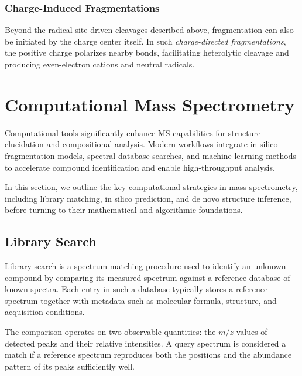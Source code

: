\subsubsection{Charge-Induced Fragmentations}

Beyond the radical-site-driven cleavages described above, fragmentation can also be initiated by the charge center itself.
In such \emph{charge-directed fragmentations}, the positive charge polarizes nearby bonds, facilitating heterolytic cleavage and producing even-electron cations and neutral radicals.
\cite[pp.~281]{Hoffmann2011}


\section{Computational Mass Spectrometry}

Computational tools significantly enhance MS capabilities for structure elucidation and compositional analysis. \cite[pp.~1--2]{Scheubert2013}
Modern workflows integrate in silico fragmentation models, spectral database searches, and machine-learning methods to accelerate compound identification and enable high-throughput analysis. \cite[p.~1]{Ashyrmamatov2025} \cite[p.~2]{Scheubert2013}

In this section, we outline the key computational strategies in mass spectrometry, including library matching, in silico prediction, and de novo structure inference, before turning to their mathematical and algorithmic foundations.

\subsection{Library Search}
\label{sec:library-search}
Library search is a spectrum-matching procedure used to identify an unknown compound by comparing its measured spectrum against a reference database of known spectra. \cite[p.~8]{Scheubert2013}
Each entry in such a database typically stores a reference spectrum together with metadata such as molecular formula, structure, and acquisition conditions.

The comparison operates on two observable quantities:
the $m/z$ values of detected peaks and their relative intensities.
A query spectrum is considered a match if a reference spectrum reproduces both the positions and the abundance pattern of its peaks sufficiently well.\cite[p.~35]{Rockwood2018}

